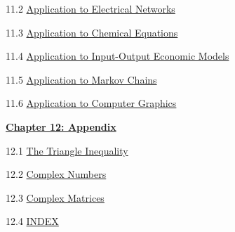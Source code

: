 \documentclass{ximera}
\begin{document}
11.2	\href{https://ximera.osu.edu/oerlinalg/LinearAlgebra/APP-0020/main}{Application to Electrical Networks}
	
11.3	\href{https://ximera.osu.edu/oerlinalg/LinearAlgebra/APP-0030/main}{Application to Chemical Equations}
	
11.4	\href{https://ximera.osu.edu/oerlinalg/LinearAlgebra/APP-0050/main}{Application to Input-Output Economic Models}
	
11.5	\href{https://ximera.osu.edu/oerlinalg/LinearAlgebra/APP-0060/main}{Application to Markov Chains}
	
11.6	\href{https://ximera.osu.edu/oerlinalg/LinearAlgebra/APP-0040/main}{Application to Computer Graphics}
	
\href{https://ximera.osu.edu/oerlinalg/LinearAlgebra/XLAChapter_appendix/main}{\textbf{Chapter 12: Appendix}}
	
12.1	\href{https://ximera.osu.edu/oerlinalg/LinearAlgebra/APX-0010/main}{The Triangle Inequality}
	
12.2	\href{https://ximera.osu.edu/oerlinalg/LinearAlgebra/APX-0020/main}{Complex Numbers}
	
12.3
\href{https://ximera.osu.edu/oerlinalg/LinearAlgebra/RTH-0050/main}{Complex Matrices}
	
12.4	\href{https://ximera.osu.edu/oerlinalg/LinearAlgebra/INDEX/main}{INDEX}
\end{document}
